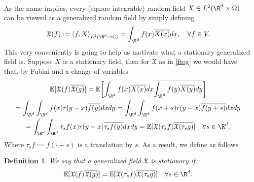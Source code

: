 \documentclass[12pt]{article}
\newtheorem{definition}{Definition}
\newcommand{\br}[1]{\left\langle#1\right\rangle}
\begin{document}
\begin{CJK*}{UTF8}{gbsn}
	\\
	As the name implies, every (square integrable) random field $X\in L^2(\R^d\times\Omega)$ can be viewed as a generalized random field by simply defining
	\begin{equation}\label{ftog}
		\mathfrak{X} (f):=\br{f,X}_{L^2(\R^d\to\C)}=\int_{\R^d}f(x)\overline{X(x)} dx, \quad\forall f\in V.
	\end{equation}
	This very conveniently is going to help us motivate what a stationary generalized field is. Suppose $X$ is a stationary field, then for $\mathfrak{X} $ as in   \eqref{ftog} we would have that, by Fubini and a change of variables
	\begin{multline}\label{stat0}
		\E[\mathfrak{X}(f)\overline{\mathfrak{X}(g)}]=\E\qty[\int_{\R^d}f(x)\overline{X(x)} dx\overline{\int_{\R^d}f(y)\overline{X(y)} dy}]\\=\int_{\R^d}\int_{\R^d}f(x)r(y-x)\overline{f(y)} dx dy=\int_{\R^d}\int_{\R^d}f(x+s)r(y-x)\overline{f(y+s)} dx dy\\=\int_{\R^d}\int_{\R^d}\tau_sf(x)r(y-x)\overline{\tau_sf(y)} dx dy=\E[\mathfrak{X}(\tau_sf)\overline{\mathfrak{X}(\tau_sg)}]\quad\forall s\in \R^d.
	\end{multline}
	Where $\tau_sf:=f(\cdot +s)$ is a translation by $s$.
	As a result, we define as follows
	\begin{definition}
		We say that a generalized field $\mathfrak{X}$ is stationary if
		\begin{equation*}
			\E[\mathfrak{X}(f)\overline{\mathfrak{X}(g)}]=\E[\mathfrak{X}(\tau_sf)\overline{\mathfrak{X}(\tau_sg)}]\quad\forall s\in \R^d.
		\end{equation*}


\end{definition}
\end{CJK*}
\end{document}
